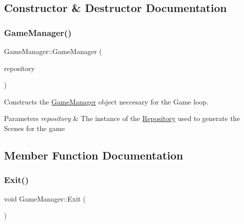 \subsection{Constructor \& Destructor Documentation}
\mbox{\label{class_game_manager_a05f6a37de95fcea1313fe4476b95941d}} 
\subsubsection{\texorpdfstring{Game\+Manager()}{GameManager()}}
{\footnotesize\ttfamily Game\+Manager\+::\+Game\+Manager (\begin{DoxyParamCaption}\item[{std\+::shared\+\_\+ptr$<$ \hyperlink{class_repositiory_interface}{Repositiory\+Interface} $>$}]{repository }\end{DoxyParamCaption})}



Constructs the \hyperlink{class_game_manager}{Game\+Manager} object neccesary for the Game loop. 


\begin{DoxyParams}{Parameters}
{\em repository} & The instance of the \hyperlink{class_repository}{Repository} used to generate the Scenes for the game \\
\hline
\end{DoxyParams}


\subsection{Member Function Documentation}
\mbox{\label{class_game_manager_acbd9fb84f9e18c8cb585738d5c89a2b9}} 
\subsubsection{\texorpdfstring{Exit()}{Exit()}}
{\footnotesize\ttfamily void Game\+Manager\+::\+Exit (\begin{DoxyParamCaption}{ }\end{DoxyParamCaption})\hspace{0.3cm}{\ttfamily [static]}}




